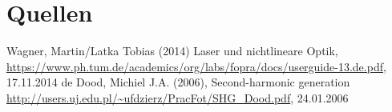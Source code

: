 \appendix
\section{Quellen}
Wagner, Martin/Latka Tobias (2014)\newline
Laser und nichtlineare Optik,  \newline
\url{https://www.ph.tum.de/academics/org/labs/fopra/docs/userguide-13.de.pdf}, 17.11.2014
\newline \newline
de Dood, Michiel J.A. (2006),\newline
Second-harmonic generation \newline \url{http://users.uj.edu.pl/~ufdzierz/PracFot/SHG_Dood.pdf}, 24.01.2006

